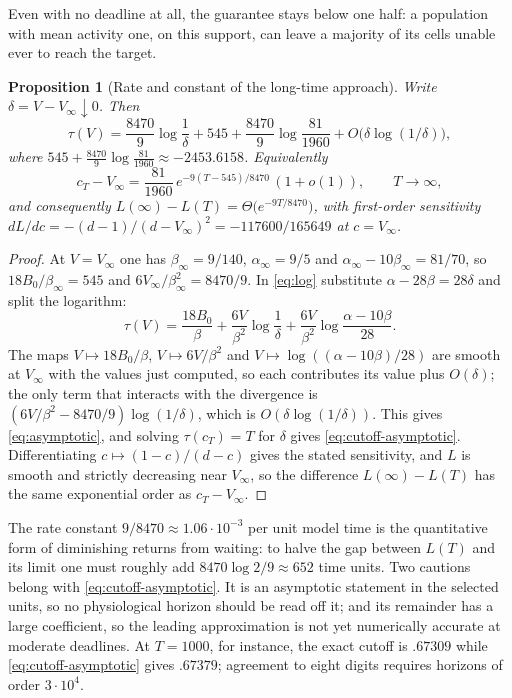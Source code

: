 \documentclass[11pt]{article}
\newtheorem{proposition}[theorem]{Proposition}
\theoremstyle{definition}
\begin{document}
Even with no deadline at all, the guarantee stays below one half: a population
with mean activity one, on this support, can leave a majority of its cells
unable ever to reach the target.

\begin{proposition}[Rate and constant of the long-time
approach]\label{prop:asymptotic}
Write $\delta=V-V_\infty\downarrow0$. Then
\begin{equation}\label{eq:asymptotic}
  \tau(V)=\frac{8470}9\log\frac1\delta
  +545+\frac{8470}9\log\frac{81}{1960}+O\!\big(\delta\log(1/\delta)\big),
\end{equation}
where $545+\frac{8470}9\log\frac{81}{1960}\approx-2453.6158$. Equivalently
\begin{equation}\label{eq:cutoff-asymptotic}
  c_T-V_\infty=\frac{81}{1960}\,e^{-9(T-545)/8470}\,(1+o(1)),
  \qquad T\to\infty,
\end{equation}
and consequently $L(\infty)-L(T)=\Theta\big(e^{-9T/8470}\big)$, with
first-order sensitivity $dL/dc=-(d-1)/(d-V_\infty)^2=-117600/165649$ at
$c=V_\infty$.
\end{proposition}
\begin{proof}
At $V=V_\infty$ one has $\beta_\infty=9/140$, $\alpha_\infty=9/5$ and
$\alpha_\infty-10\beta_\infty=81/70$, so $18B_0/\beta_\infty=545$ and
$6V_\infty/\beta_\infty^2=8470/9$. In \eqref{eq:log} substitute
$\alpha-28\beta=28\delta$ and split the logarithm:
\[
  \tau(V)=\frac{18B_0}\beta+\frac{6V}{\beta^2}\log\frac1\delta
  +\frac{6V}{\beta^2}\log\frac{\alpha-10\beta}{28}.
\]
The maps $V\mapsto18B_0/\beta$, $V\mapsto6V/\beta^2$ and
$V\mapsto\log((\alpha-10\beta)/28)$ are smooth at $V_\infty$ with the values
just computed, so each contributes its value plus $O(\delta)$; the only term
that interacts with the divergence is $(6V/\beta^2-8470/9)\log(1/\delta)$,
which is $O(\delta\log(1/\delta))$. This gives \eqref{eq:asymptotic}, and
solving $\tau(c_T)=T$ for $\delta$ gives
\eqref{eq:cutoff-asymptotic}. Differentiating $c\mapsto(1-c)/(d-c)$ gives the
stated sensitivity, and $L$ is smooth and strictly decreasing near $V_\infty$,
so the difference $L(\infty)-L(T)$ has the same exponential order as
$c_T-V_\infty$.
\end{proof}

The rate constant $9/8470\approx1.06\cdot10^{-3}$ per unit model time is the
quantitative form of diminishing returns from waiting: to halve the gap
between $L(T)$ and its limit one must roughly add $8470\log2/9\approx652$ time
units. Two cautions belong with \eqref{eq:cutoff-asymptotic}. It is an
asymptotic statement in the selected units, so no physiological horizon should
be read off it; and its remainder has a large coefficient, so the leading
approximation is not yet numerically accurate at moderate deadlines. At
$T=1000$, for instance, the exact cutoff is $.67309$ while
\eqref{eq:cutoff-asymptotic} gives $.67379$; agreement to eight digits requires
horizons of order $3\cdot10^4$.
\end{document}
